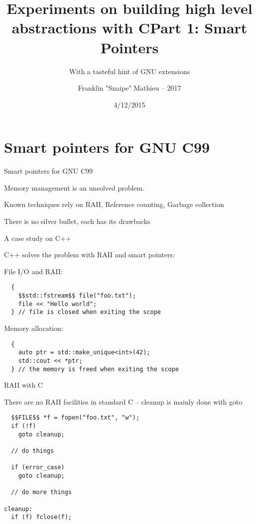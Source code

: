 \documentclass[10pt]{beamer}
\title{Experiments on building high level abstractions with C\newline\newline Part 1: Smart Pointers}
\subtitle{With a tasteful hint of GNU extensions}
\date{4/12/2015}
\author{Franklin "Snaipe" Mathieu -- 2017}
\institute{EPITA -- GCONFS}
\begin{document}
\maketitle

\section{Smart pointers for GNU C99}

\begin{frame}{Smart pointers for GNU C99}

  Memory management is an unsolved problem.

  Known techniques rely on RAII, Reference counting, Garbage collection

  There is no silver bullet, each has its drawbacks

\end{frame}

\begin{frame}[fragile]{A case study on C++}

  C++ solves the problem with RAII and smart pointers:

  \pause{}

  File I/O and RAII:

  \begin{lstlisting}
  {
    $$std::fstream$$ file("foo.txt");
    file << "Hello world";
  } // file is closed when exiting the scope
  \end{lstlisting}

  \pause{}

  Memory allocation:

  \begin{lstlisting}
  {
    auto ptr = std::make_unique<int>(42);
    std::cout << *ptr;
  } // the memory is freed when exiting the scope
  \end{lstlisting}

\end{frame}

\begin{frame}[fragile]{RAII with C}

  There are no RAII facilities in standard C -- cleanup is mainly done with goto

  \begin{lstlisting}
  $$FILE$$ *f = fopen("foo.txt", "w");
  if (!f)
    goto cleanup;

  // do things

  if (error_case)
    goto cleanup;

  // do more things

cleanup:
  if (f) fclose(f);
  \end{lstlisting}

\end{frame}
\end{document}
